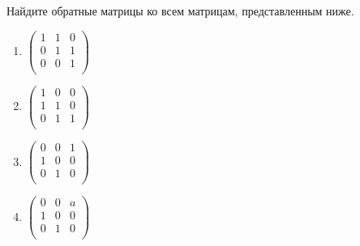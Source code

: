 \documentclass[pdftex,11pt,openany]{book}\usepackage[]{graphicx}\usepackage[]{color}
\begin{document}
\begin{problem}
Найдите обратные матрицы ко всем матрицам, представленным ниже.
\begin{enumerate}
\item
\ensuremath{%
\begin{pmatrix}{}
    1 &   1 &   0 \\ 
    0 &   1 &   1 \\ 
    0 &   0 &   1 \\ 
  \end{pmatrix}
}
\item
\ensuremath{%
\begin{pmatrix}{}
    1 &   0 &   0 \\ 
    1 &   1 &   0 \\ 
    0 &   1 &   1 \\ 
  \end{pmatrix}
}
\item
\ensuremath{%
\begin{pmatrix}{}
    0 &   0 &   1 \\ 
    1 &   0 &   0 \\ 
    0 &   1 &   0 \\ 
  \end{pmatrix}
}
\item
\ensuremath{%
\begin{pmatrix}{}
  0 & 0 & a \\ 
  1 & 0 & 0 \\ 
  0 & 1 & 0 \\ 
  \end{pmatrix}
}
\end{enumerate}
\end{problem}

\begin{solution}
\end{solution}
\end{document}
